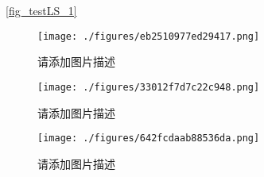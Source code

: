 
\autoref{fig_testLS_1}~




\begin{figure}[ht]
\centering
\texttt{[image: ./figures/eb2510977ed29417.png]}
\caption{请添加图片描述} \label{fig_testcd_1}
\end{figure}

\begin{figure}[ht]
\centering
\texttt{[image: ./figures/33012f7d7c22c948.png]}
\caption{请添加图片描述} \label{fig_testcd_2}
\end{figure}

\begin{figure}[ht]
\centering
\texttt{[image: ./figures/642fcdaab88536da.png]}
\caption{请添加图片描述} \label{fig_testcd_3}
\end{figure}